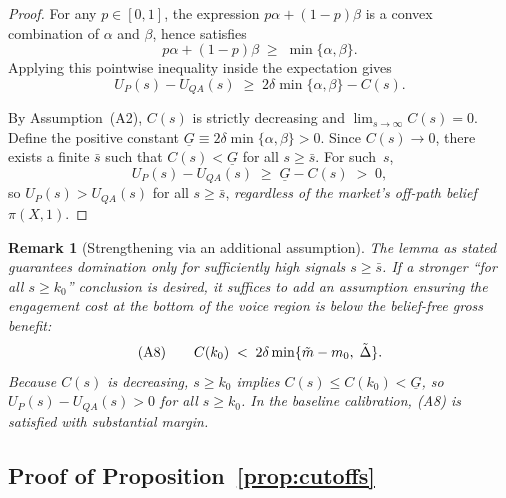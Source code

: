 \documentclass[11pt]{article}
\newtheorem{remark}{Remark}
\newcommand{\1}{\mathbf{1}}
\begin{document}
\begin{proof}
For any $p\in[0,1]$, the expression $p\alpha+(1-p)\beta$ is a convex combination of $\alpha$ and $\beta$, hence satisfies
\[
p\alpha+(1-p)\beta\;\ge\;\min\{\alpha,\beta\}.
\]
Applying this pointwise inequality inside the expectation gives
\[
U_P(s)-U_{QA}(s)\;\ge\;2\delta\min\{\alpha,\beta\}-C(s).
\]

By Assumption~\textup{(A2)}, $C(s)$ is strictly decreasing and $\lim_{s\to\infty}C(s)=0$.
Define the positive constant $\underline G\equiv 2\delta\min\{\alpha,\beta\}>0$.
Since $C(s)\to 0$, there exists a finite $\bar s$ such that $C(s)<\underline G$ for all $s\ge \bar s$.
For such~$s$,
\[
U_P(s)-U_{QA}(s)\;\ge\;\underline G-C(s)\;>\;0,
\]
so $U_P(s)>U_{QA}(s)$ for all $s\ge\bar s$, \emph{regardless of the market's off-path belief $\pi(X,1)$}.
\end{proof}

\begin{remark}[Strengthening via an additional assumption]
\label{rem:qa-strengthening}
The lemma as stated guarantees domination only for sufficiently high signals $s\ge\bar s$. If a stronger ``for all $s\ge k_0$'' conclusion is desired, it suffices to add an assumption ensuring the engagement cost at the bottom of the voice region is below the belief-free gross benefit:
\[
\textup{(A8)}\qquad C(k_0)\;<\;2\delta\min\{\tilde m-m_0,\;\tilde\Delta\}.
\]
Because $C(s)$ is decreasing, $s\ge k_0$ implies $C(s)\le C(k_0)<\underline G$, so $U_P(s)-U_{QA}(s)>0$ for all $s\ge k_0$. In the baseline calibration, (A8) is satisfied with substantial margin.
\end{remark}

\subsection{Proof of Proposition~\ref{prop:cutoffs}}
\label{app:proof-cutoffs}
\end{document}
